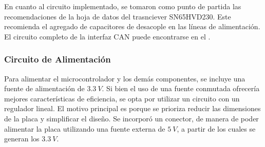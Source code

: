 En cuanto al circuito implementado, se tomaron como punto de partida las recomendaciones de la hoja de datos del trasnciever SN65HVD230. Este recomienda el agregado de capacitores de desacople en las líneas de alimentación. %
El circuito completo de la interfaz CAN puede encontrarse en el .





\subsubsection{Circuito de Alimentación}\label{sec:circuito_de_alimentacion}

Para alimentar el microcontrolador y los demás componentes, se incluye una fuente de alimentación de $3.3 \ V$. Si bien el uso de una fuente conmutada ofrecería mejores características de eficiencia, se opta por utilizar un circuito con un regulador lineal. El motivo principal es porque se prioriza reducir las dimensiones de la placa y simplificar el diseño. Se incorporó un conector, de manera de poder alimentar la placa utilizando una fuente externa de $5 \ V$, a partir de los cuales se generan los $3.3 \ V$.


